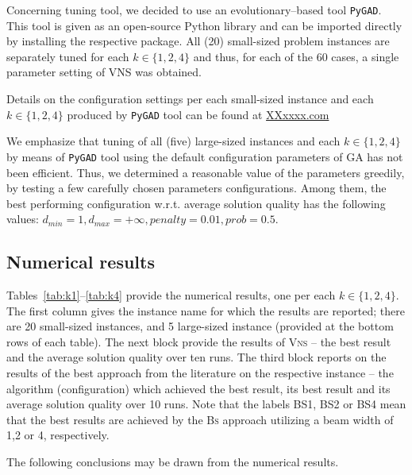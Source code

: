 \documentclass[dvipsnames,format=sigconf,anonymous=true,review=true]{acmart}
\begin{document}
   Concerning tuning tool, we decided to use an evolutionary--based tool \texttt{PyGAD}. This tool is given as an open-source Python library and can be imported directly by installing the respective package. All (20) small-sized problem instances are separately tuned for each $k\in \{1, 2, 4\}$ and thus, for each of the 60 cases, a single parameter setting of VNS was obtained. 
  
    
     Details on the configuration settings per each small-sized instance and each $k\in \{1, 2, 4\}$ produced by \texttt{PyGAD} tool can be found at \url{XXxxxx.com}
     
     We emphasize that tuning of all (five) large-sized instances and each $k \in \{1,2,4\}$  by means of \texttt{PyGAD} tool using the default configuration parameters of GA has not been efficient. Thus, we determined a reasonable  value of the parameters  greedily, by testing a few carefully chosen parameters configurations. Among them, the best performing configuration w.r.t. average solution quality has the following values: $d_{min}=1, d_{max} = + \infty, penalty = 0.01, prob=0.5$. 

\subsection{Numerical results }
 Tables~\ref{tab:k1}--\ref{tab:k4} provide the numerical results, one per each $k \in \{1, 2,4\}$. The first column gives the instance name for which the results are reported; there are 20 small-sized instances, and 5 large-sized instance (provided at the   bottom rows of each table). The next block  provide the results of \textsc{Vns} -- the best result and the average solution quality over ten runs. The third block reports on the results of the best approach from the literature on the respective instance -- the algorithm (configuration) which achieved the best result, its best result  and its average solution quality over 10 runs. Note that the labels BS1, BS2 or BS4 mean  that the best results are achieved by the \textsc{Bs} approach  utilizing a beam width of 1,2 or 4, respectively. 
 
   The following conclusions may be drawn from the numerical results. 
   
\end{document}
